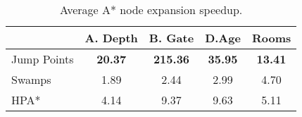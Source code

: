 \begin{table}[tb]
\begin{center}
\begin{tabular}{lcccc}
  \hline
 & A. Depth & B. Gate & D.Age & Rooms \\ 
  \hline
Jump Points & \textbf{20.37} & \textbf{215.36} & \textbf{35.95} & \textbf{13.41} \\ 
  Swamps & 1.89 & 2.44 & 2.99 & 4.70 \\ 
  HPA* & 4.14 & 9.37 & 9.63 & 5.11 \\ 
   \hline
\end{tabular}
\end{center}
\caption{Average A* node expansion speedup.} 
\label{table:nodes}
\end{table}

